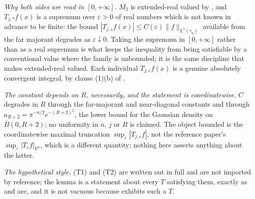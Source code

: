 \begin{lemma}
\emph{Why both sides are read in $[0,+\infty]$.}  $M_2$ is extended-real valued
by , and $T_{j,*}f(x)$ is a supremum over
$\varepsilon > 0$ of real numbers which is not known in advance to be finite:
the bound $|T_{j,\varepsilon}f(x)| \leq C(\varepsilon)\|f\|_{L^1(\gamma_n)}$
available from the far majorant degrades as $\varepsilon \downarrow 0$.  Taking
the supremum in $[0,+\infty]$ rather than as a real supremum is what keeps the
inequality from being satisfiable by a conventional value where the family is
unbounded; it is the same discipline that makes 
extended-real valued.  Each individual $T_{j,\varepsilon}f(x)$ is a genuine
absolutely convergent integral, by clause (1)(b) of
.

\emph{The constant depends on $R$, necessarily, and the statement is
coordinatewise.}  $C$ degrades in $R$ through the far-majorant and
near-diagonal constants and through $a_{R+2} = \pi^{-n/2}e^{-(R+2)^2}$, the
lower bound for the Gaussian density on $\overline B(0,R+2)$; no uniformity in
$n$, $j$ or $R$ is claimed.  The object bounded is the coordinatewise maximal
truncation $\sup_\varepsilon|T_{j,\varepsilon}f|$, not the reference paper's
$\sup_\varepsilon|T_\varepsilon f|_{\mathbb{R}^n}$, which is a different
quantity; nothing here asserts anything about the latter.

\emph{The hypothetical style.}  (T1) and (T2) are written out in full and are
not imported by reference; the lemma is a statement about every $T$ satisfying
them, exactly as  and
 are, and it is not vacuous because
 exhibits such a $T$.
\end{lemma}
